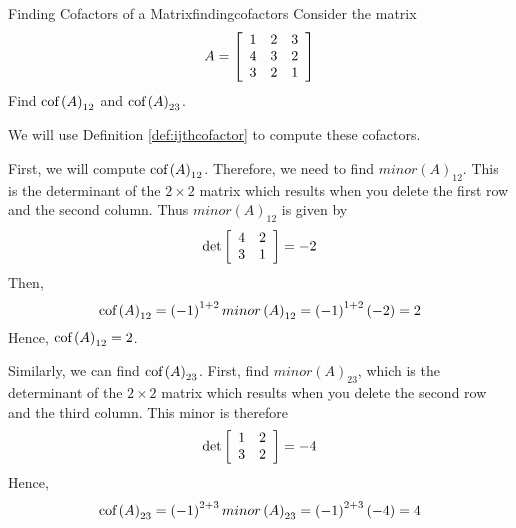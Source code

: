 \begin{example}{Finding Cofactors of a Matrix}{findingcofactors}
Consider the matrix
\begin{equation*}
A=\left[
\begin{array}{rrr}
1 & 2 & 3 \\
4 & 3 & 2 \\
3 & 2 & 1
\end{array}
\right] 
\end{equation*}
Find $\mbox{cof}\left( A\right) _{12}$ and $\mbox{cof}\left( A\right) _{23}$.
\end{example}

\begin{solution} We will use Definition \ref{def:ijthcofactor} to compute these cofactors. 

First, we will compute $\mbox{cof}\left( A\right) _{12}$. 
Therefore, we need to find $minor\left(A\right)_{12}$. This is the determinant of the $2\times 2$ matrix
which results when you delete the first row and the second column. Thus $minor\left(A\right)_{12}$ is given by 
\begin{equation*}
\det \left[
\begin{array}{rr}
4 & 2 \\
3 & 1
\end{array}
\right] = -2
\end{equation*}
Then,
\begin{equation*}
\mbox{cof}\left( A\right) _{12}=\left( -1\right) ^{1+2} minor\left(A\right)_{12} =\left( -1\right) ^{1+2}\left( -2\right) =2
\end{equation*}
Hence, $\mbox{cof}\left( A\right) _{12}=2$.

Similarly, we can find $\mbox{cof}\left( A\right) _{23}$. First, find $minor\left(A\right)_{23}$, which is the determinant of the $2\times 2$ matrix
which results when you delete the second row and the third column. This
minor is therefore
\begin{equation*}
\det \left[
\begin{array}{rr}
1 & 2 \\
3 & 2
\end{array}
\right] = -4
\end{equation*}
Hence,
\begin{equation*}
\mbox{cof}\left( A\right) _{23}=\left( -1\right) ^{2+3} minor\left(A\right)_{23} =\left( -1\right) ^{2+3}\left( -4\right) =4
\end{equation*}
\end{solution}

